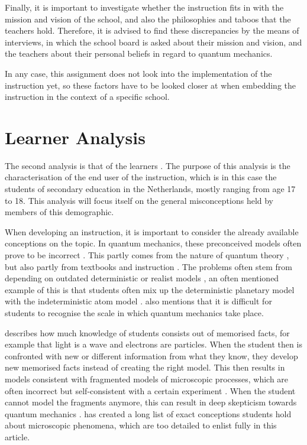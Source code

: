 \documentclass[11pt,twoside]{report} %
\begin{document}
Finally, it is important to investigate whether the instruction fits in with the mission and vision of the school, and also the philosophies and taboos that the teachers hold. Therefore, it is advised to find these discrepancies by the means of interviews, in which the school board is asked about their mission and vision, and the teachers about their personal beliefs in regard to quantum mechanics.

In any case, this assignment does not look into the implementation of the instruction yet, so these factors have to be looked closer at when embedding the instruction in the context of a specific school.


\section{Learner Analysis}
\label{sec:learneranalysis}

The second analysis is that of the learners \cite{smithragan}. The purpose of this analysis is the characterisation of the end user of the instruction, which is in this case the students of secondary education in the Netherlands, mostly ranging from age 17 to 18. This analysis will focus itself on the general misconceptions held by members of this demographic.

When developing an instruction, it is important to consider the already available conceptions on the topic. In quantum mechanics, these preconceived models often prove to be incorrect \cite{asikainen, papaphotis2, thacker}. This partly comes from the nature of quantum theory \cite{papaphotis2}, but also partly from textbooks and instruction \cite{hubber, papaphotis2}. The problems often stem from depending on outdated deterministic or realist models \cite{hubber, papaphotis1, papaphotis2}, an often mentioned example of this is that students often mix up the deterministic planetary model with the indeterministic atom model \cite{dori, henriksen, hubber, muller, papaphotis1, papaphotis2}.  also mentions that it is difficult for students to recognise the scale in which quantum mechanics take place.

 describes how much knowledge of students consists out of memorised facts, for example that light is a wave and electrons are particles. When the student then is confronted with new or different information from what they know, they develop new memorised facts instead of creating the right model. This then results in models consistent with fragmented models of microscopic processes, which are often incorrect but self-consistent with a certain experiment \cite{hubber, thacker}. When the student cannot model the fragments anymore, this can result in deep skepticism towards quantum mechanics \cite{barnes, henriksen, levrini}.  has created a long list of exact conceptions students hold about microscopic phenomena, which are too detailed to enlist fully in this article.
\end{document}
